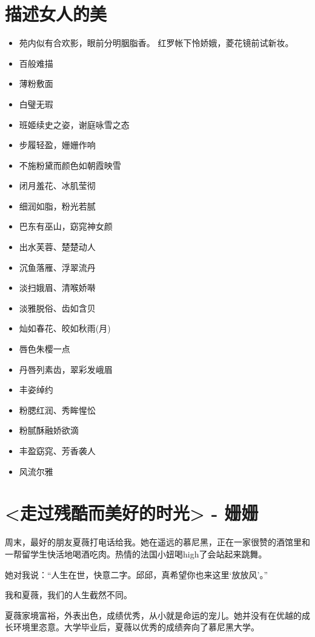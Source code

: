 \documentclass[UTF8,a4paper,8pt]{ctexart}
\begin{document}
 \section{描述女人的美}
 \begin{itemize}
 	\item 苑内似有合欢影，眼前分明胭脂香。 红罗帐下怜娇娥，菱花镜前试新妆。
 	\item 百般难描
 	\item 薄粉敷面
 	\item 白璧无瑕
 	\item 班姬续史之姿，谢庭咏雪之态 
 	\item 步履轻盈，姗姗作响
 	\item 不施粉黛而颜色如朝霞映雪
 	\item 闭月羞花、冰肌莹彻
 	\item 细润如脂，粉光若腻
 	\item 巴东有巫山，窈窕神女颜
 	\item 出水芙蓉、楚楚动人
 	\item 沉鱼落雁、浮翠流丹
 	\item 淡扫娥眉、清喉娇啭
 	\item 淡雅脱俗、齿如含贝
 	\item 灿如春花、皎如秋雨(月)
 	\item 唇色朱樱一点
 	\item 丹唇列素齿，翠彩发峨眉
 	\item 丰姿绰约
 	\item 粉腮红润、秀眸惺忪
 	\item 粉腻酥融娇欲滴
 	\item 丰盈窈窕、芳香袭人
 	\item 风流尔雅
 \end{itemize}
 
 
 \newpage
 
 \section{<走过残酷而美好的时光> - 姗姗}
 周末，最好的朋友夏薇打电话给我。她在遥远的慕尼黑，正在一家很赞的酒馆里和一帮留学生快活地喝酒吃肉。热情的法国小妞喝high了会站起来跳舞。
 
 她对我说：“人生在世，快意二字。邱邱，真希望你也来这里‘放放风’。”
 
 我和夏薇，我们的人生截然不同。
 
 夏薇家境富裕，外表出色，成绩优秀，从小就是命运的宠儿。她并没有在优越的成长环境里恣意。大学毕业后，夏薇以优秀的成绩奔向了慕尼黑大学。
 
\end{document}
